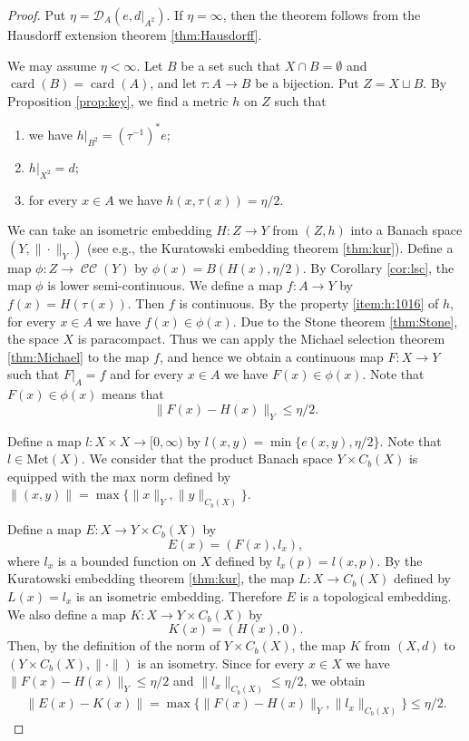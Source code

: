 \documentclass[a4paper, 12pt]{amsart}
\theoremstyle{plain}
\theoremstyle{definition}
\theoremstyle{remark}
\DeclareMathOperator{\card}{card}
\DeclareMathOperator{\conv}{\mathcal{CC}}
\newcommand{\met}[1]{\mathrm{Met}(#1)}
\newcommand{\metdis}{\mathcal{D}}
\begin{document}
\begin{proof}
Put 
$\eta=\metdis_{A}(e, d|_{A^2})$. 
If 
$\eta=\infty$, 
then
the theorem  follows 
from 
the Hausdorff extension theorem 
\ref{thm:Hausdorff}. 





We may assume 
$\eta<\infty$.
Let 
$B$ 
be a set such that 
$X\cap B=\emptyset$
and $\card(B)=\card(A)$, 
and 
let 
$\tau\colon  A\to B$ 
be a bijection. 
Put 
$Z=X\sqcup B$. 
By Proposition 
\ref{prop:key},  
we find a metric
 $h$ 
 on 
 $Z$ 
 such that
\begin{enumerate}[label=\textup{(H\arabic*)}]
	\item
	  we have $h|_{B^{2}}=(\tau^{-1})^{*}e$; 
	
	\item 
	$h|_{X^{2}}=d$; 
	
	\item\label{item:h:1016}
	for every 
	$x\in A$ 
	we have 
	$h(x, \tau(x))= \eta/2$. 
\end{enumerate}

We can take an isometric embedding 
$H\colon Z\to Y$ 
from 
$(Z, h)$ 
into a Banach space 
$(Y, \|\cdot\|_{Y})$ 
(see e.g.,  the Kuratowski embedding theorem \ref{thm:kur}). 
Define a map 
$\phi\colon  Z\to \conv(Y)$ 
by 
$\phi(x)=B(H(x), \eta/2)$. 
By Corollary 
\ref{cor:lsc}, 
the map 
$\phi$
 is lower semi-continuous. 
We define a map 
$f\colon  A\to Y$ 
by 
$f(x)=H(\tau(x))$. 
Then 
$f$ 
is continuous. 
By the property  
\ref{item:h:1016}
 of 
 $h$,  
for every 
$x\in A$ 
we have 
$f(x)\in \phi(x)$. 
Due to the Stone theorem
 \ref{thm:Stone},  
the space 
$X$ 
is paracompact. 
Thus
we can  apply  the Michael selection  theorem \ref{thm:Michael} 
to the map 
$f$, 
and hence
we obtain a continuous map
$F\colon X\to Y$ 
such that 
$F|_{A}=f$ 
and for every 
$x\in A$ 
we have 
$F(x)\in \phi(x)$. 
Note that 
$F(x)\in \phi(x)$ 
means that 
\[
\|F(x)-H(x)\|_Y\le \eta/2.
\] 


Define a map 
$l\colon X\times X\to [0, \infty)$ 
 by 
$l(x, y)=\min\{e(x, y), \eta/2\}$. 
Note that 
$l\in \met{X}$. 
We consider that the product Banach space 
$Y\times C_{b}(X)$ 
is equipped with 
the max norm defined by 
$\|(x, y)\|=\max\{\|x\|_{Y}, \|y\|_{C_{b}(X)}\}$. 

Define a map 
$E\colon X\to Y\times C_{b}(X)$ 
by 
	\[
	E(x)=(F(x), l_x), 
	\]
where 
$l_{x}$ 
is a bounded function on 
$X$  
defined by 
$l_{x}(p)=l(x, p)$. 
By the Kuratowski embedding theorem 
\ref{thm:kur}, 
the map 
$L\colon  X\to C_b(X)$ 
defined by 
$L(x)=l_{x}$ 
is an isometric embedding.   
Therefore 
$E$ 
is a topological embedding. 
We also define a map 
$K\colon  X\to Y\times C_{b}(X)$ 
by 
	\[
	K(x)=(H(x), 0). 
	\]
Then, 
by the definition of the norm of 
$Y\times C_{b}(X)$,  
the map 
$K$ 
from 
$(X, d)$ 
to 
$(Y\times C_{b}(X), \|\cdot\|)$ 
is an isometry. 
Since for every 
$x\in X$ 
we have 
$\|F(x)-H(x)\|_{Y}\le \eta/2$ 
and  
$\|l_x\|_{C_{b}(X)}\le \eta/2$, 
we obtain 
\begin{align}
	\|E(x)-K(x)\|=\max\{\|F(x)-H(x)\|_{Y}, \|l_x\|_{C_{b}(X)}\}\le \eta/2.\label{al:keyinq}
\end{align}


\end{proof}
\end{document}
